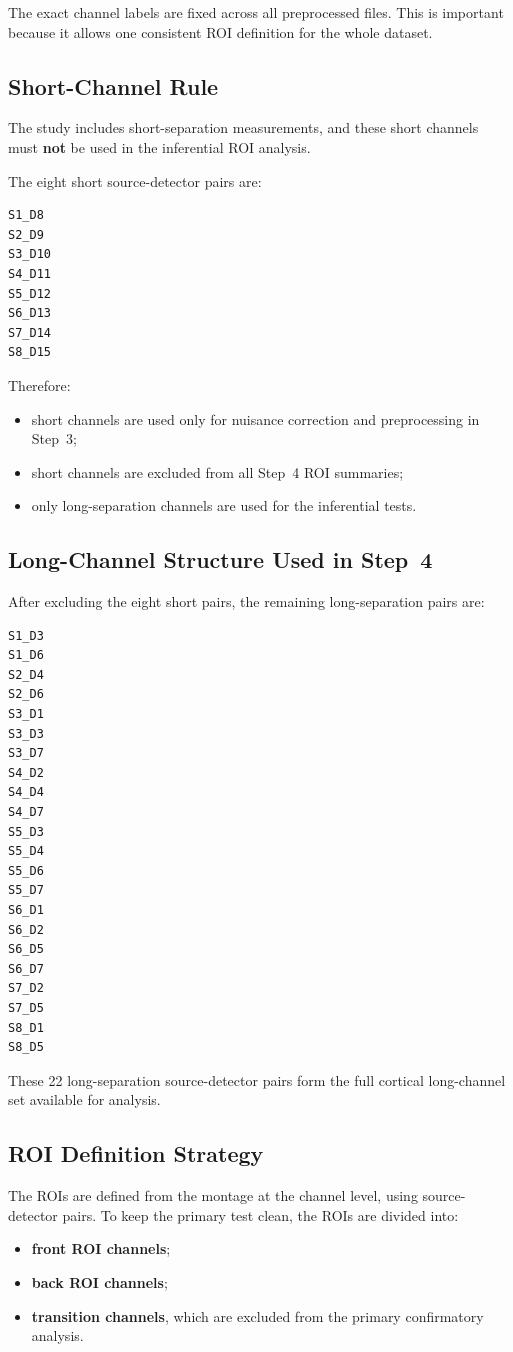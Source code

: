 \documentclass[11pt]{article}
\begin{document}
The exact channel labels are fixed across all preprocessed files.
This is important because it allows one consistent ROI definition for the whole dataset.

\subsection{Short-Channel Rule}
The study includes short-separation measurements, and these short channels must \textbf{not}
be used in the inferential ROI analysis.

The eight short source-detector pairs are:
\begin{verbatim}
S1_D8
S2_D9
S3_D10
S4_D11
S5_D12
S6_D13
S7_D14
S8_D15
\end{verbatim}

Therefore:
\begin{itemize}
    \item short channels are used only for nuisance correction and preprocessing in Step~3;
    \item short channels are excluded from all Step~4 ROI summaries;
    \item only long-separation channels are used for the inferential tests.
\end{itemize}

\subsection{Long-Channel Structure Used in Step~4}
After excluding the eight short pairs, the remaining long-separation pairs are:
\begin{verbatim}
S1_D3
S1_D6
S2_D4
S2_D6
S3_D1
S3_D3
S3_D7
S4_D2
S4_D4
S4_D7
S5_D3
S5_D4
S5_D6
S5_D7
S6_D1
S6_D2
S6_D5
S6_D7
S7_D2
S7_D5
S8_D1
S8_D5
\end{verbatim}

These 22 long-separation source-detector pairs form the full cortical long-channel set available
for analysis.

\subsection{ROI Definition Strategy}
The ROIs are defined from the montage at the channel level, using source-detector pairs.
To keep the primary test clean, the ROIs are divided into:
\begin{itemize}
    \item \textbf{front ROI channels};
    \item \textbf{back ROI channels};
    \item \textbf{transition channels}, which are excluded from the primary confirmatory analysis.
\end{itemize}
\end{document}
